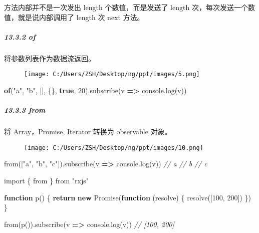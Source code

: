 \documentclass[
]{article}
\newenvironment{Shaded}{}{}
\newcommand{\BuiltInTok}[1]{#1}
\newcommand{\CommentTok}[1]{\textcolor[rgb]{0.38,0.63,0.69}{\textit{#1}}}
\newcommand{\ControlFlowTok}[1]{\textcolor[rgb]{0.00,0.44,0.13}{\textbf{#1}}}
\newcommand{\DecValTok}[1]{\textcolor[rgb]{0.25,0.63,0.44}{#1}}
\newcommand{\FunctionTok}[1]{\textcolor[rgb]{0.02,0.16,0.49}{#1}}
\newcommand{\ImportTok}[1]{#1}
\newcommand{\KeywordTok}[1]{\textcolor[rgb]{0.00,0.44,0.13}{\textbf{#1}}}
\newcommand{\NormalTok}[1]{#1}
\newcommand{\OperatorTok}[1]{\textcolor[rgb]{0.40,0.40,0.40}{#1}}
\newcommand{\StringTok}[1]{\textcolor[rgb]{0.25,0.44,0.63}{#1}}
\begin{document}
方法内部并不是一次发出 length 个数值，而是发送了 length
次，每次发送一个数值，就是说内部调用了 length 次 next 方法。

\hypertarget{1332-of}{%
\subparagraph{13.3.2 of}\label{1332-of}}

将参数列表作为数据流返回。

\begin{figure}
\centering
\texttt{[image: C:/Users/ZSH/Desktop/ng/ppt/images/5.png]}
\caption{}
\end{figure}

\begin{Shaded}
\begin{Highlighting}[]
\KeywordTok{of}\NormalTok{(}\StringTok{"a"}\OperatorTok{,} \StringTok{"b"}\OperatorTok{,}\NormalTok{ []}\OperatorTok{,}\NormalTok{ \{\}}\OperatorTok{,} \KeywordTok{true}\OperatorTok{,} \DecValTok{20}\NormalTok{)}\OperatorTok{.}\FunctionTok{subscribe}\NormalTok{(v }\KeywordTok{=\textgreater{}} \BuiltInTok{console}\OperatorTok{.}\FunctionTok{log}\NormalTok{(v))}
\end{Highlighting}
\end{Shaded}

\hypertarget{1333-from}{%
\subparagraph{13.3.3 from}\label{1333-from}}

将 Array，Promise, Iterator 转换为 observable 对象。

\begin{figure}
\centering
\texttt{[image: C:/Users/ZSH/Desktop/ng/ppt/images/10.png]}
\caption{}
\end{figure}

\begin{Shaded}
\begin{Highlighting}[]
\ImportTok{from}\NormalTok{([}\StringTok{"a"}\OperatorTok{,} \StringTok{"b"}\OperatorTok{,} \StringTok{"c"}\NormalTok{])}\OperatorTok{.}\FunctionTok{subscribe}\NormalTok{(v }\KeywordTok{=\textgreater{}} \BuiltInTok{console}\OperatorTok{.}\FunctionTok{log}\NormalTok{(v))}
\CommentTok{// a}
\CommentTok{// b}
\CommentTok{// c}
\end{Highlighting}
\end{Shaded}

\begin{Shaded}
\begin{Highlighting}[]
\ImportTok{import}\NormalTok{ \{ }\ImportTok{from}\NormalTok{ \} }\ImportTok{from} \StringTok{"rxjs"}

\KeywordTok{function} \FunctionTok{p}\NormalTok{() \{}
  \ControlFlowTok{return} \KeywordTok{new} \BuiltInTok{Promise}\NormalTok{(}\KeywordTok{function}\NormalTok{ (resolve) \{}
    \FunctionTok{resolve}\NormalTok{([}\DecValTok{100}\OperatorTok{,} \DecValTok{200}\NormalTok{])}
\NormalTok{  \})}
\NormalTok{\}}

\ImportTok{from}\NormalTok{(}\FunctionTok{p}\NormalTok{())}\OperatorTok{.}\FunctionTok{subscribe}\NormalTok{(v }\KeywordTok{=\textgreater{}} \BuiltInTok{console}\OperatorTok{.}\FunctionTok{log}\NormalTok{(v))}
\CommentTok{// [100, 200]}
\end{Highlighting}
\end{Shaded}
\end{document}
